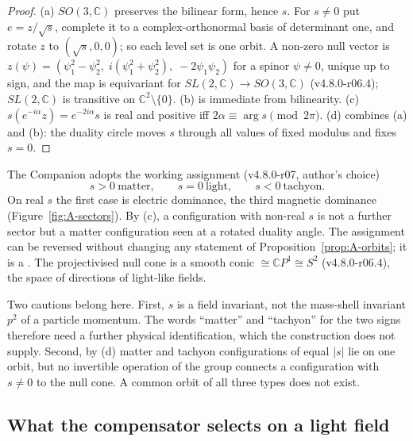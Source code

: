 \begin{proof}
(a) $SO(3,\mathbb C)$ preserves the bilinear form, hence $s$. For $s\neq0$ put $e=z/\sqrt s$, complete
it to a complex-orthonormal basis of determinant one, and rotate $z$ to $(\sqrt s,0,0)$; so each level
set is one orbit. A non-zero null vector is $z(\psi)=(\psi_1^2-\psi_2^2,\;i(\psi_1^2+\psi_2^2),\;
-2\psi_1\psi_2)$ for a spinor $\psi\neq0$, unique up to sign, and the map is equivariant for
$SL(2,\mathbb C)\to SO(3,\mathbb C)$ (v4.8.0-r06.4); $SL(2,\mathbb C)$ is transitive on
$\mathbb C^2\setminus\{0\}$. (b) is immediate from bilinearity. (c) $s(e^{-i\alpha}z)=e^{-2i\alpha}s$ is
real and positive iff $2\alpha\equiv\arg s\pmod{2\pi}$. (d) combines (a) and (b): the duality circle
moves $s$ through all values of fixed modulus and fixes $s=0$.
\end{proof}

The Companion adopts the working assignment (v4.8.0-r07, author's choice)
\begin{equation}
s>0\ \text{matter},\qquad s=0\ \text{light},\qquad s<0\ \text{tachyon}.
\label{eq:A-assignment}
\end{equation}
On real $s$ the first case is electric dominance, the third magnetic dominance
(Figure~\ref{fig:A-sectors}). By (c), a configuration with non-real $s$ is not a further sector but a
matter configuration seen at a rotated duality angle. The assignment can be reversed without changing
any statement of Proposition~\ref{prop:A-orbits}; it is a \Reading. The projectivised null cone is a
smooth conic $\cong\mathbb CP^1\cong S^2$ (v4.8.0-r06.4), the space of directions of light-like
fields.

Two cautions belong here. First, $s$ is a field invariant, not the mass-shell invariant $p^2$ of a
particle momentum. The words ``matter'' and ``tachyon'' for the two signs therefore need a further
physical identification, which the construction does not supply. Second, by (d) matter and tachyon
configurations of equal $|s|$ lie on one orbit, but no invertible operation of the group connects a
configuration with $s\neq0$ to the null cone. A common orbit of all three types does not exist.



\subsection{What the compensator selects on a light field}
\label{sec:A-field-example}

